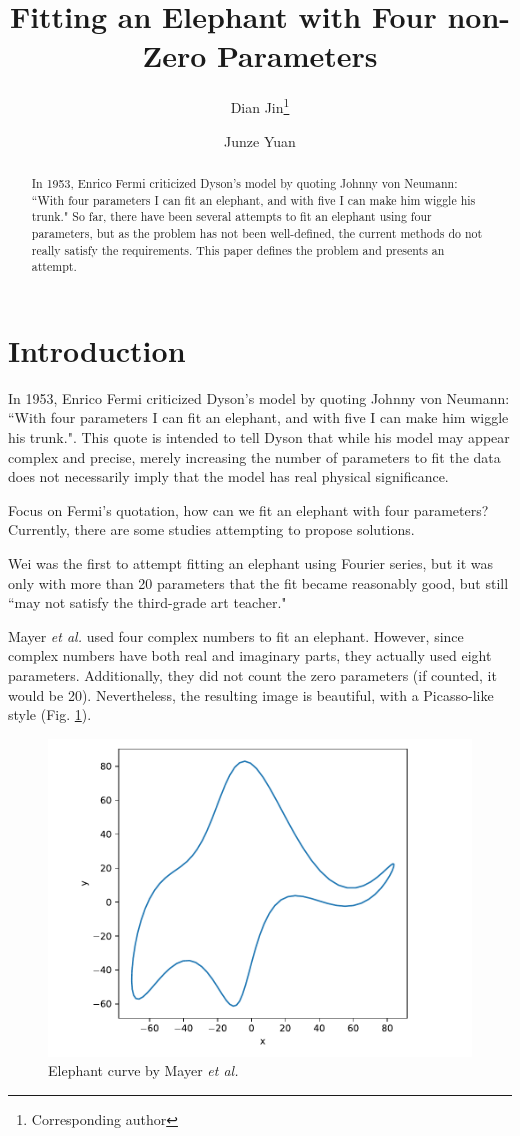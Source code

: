 \documentclass{article}
\title{Fitting an Elephant with Four non-Zero Parameters}
\author[1]{Dian Jin\thanks{Corresponding author} }
\author[2]{Junze Yuan}
\affil[1]{\textit{Research Institute for Intelligent Wearable Systems, The Hong Kong Polytechinic University}}
\affil[2]{\textit{Tampere University}}
\date{}
\begin{document}
	
\maketitle

\begin{abstract}
	In 1953, Enrico Fermi criticized Dyson’s model by quoting Johnny von Neumann: ``With four parameters I can fit an elephant, and with five I can make him wiggle his trunk." So far, there have been several attempts to fit an elephant using four parameters, but as the problem has not been well-defined, the current methods do not really satisfy the requirements. This paper defines the problem and presents an attempt.
\end{abstract}

\section{Introduction}
In 1953, Enrico Fermi criticized Dyson’s model by quoting Johnny von Neumann: ``With four parameters I can fit an elephant, and with five I can make him wiggle his trunk."\cite{dyson2004meeting}.
This quote is intended to tell Dyson that while his model may appear complex and precise, merely increasing the number of parameters to fit the data does not necessarily imply that the model has real physical significance. 

Focus on Fermi's quotation, how can we fit an elephant with four parameters? Currently, there are some studies attempting to propose solutions.

Wei \cite{wei1975least} was the first to attempt fitting an elephant using Fourier series, but it was only with more than 20 parameters that the fit became reasonably good, but still ``may not satisfy the third-grade art teacher."

Mayer \textit{et al.} \cite{mayerDrawingElephantFour2010} used four complex numbers to fit an elephant. However, since complex numbers have both real and imaginary parts, they actually used eight parameters. Additionally, they did not count the zero parameters (if counted, it would be 20). Nevertheless, the resulting image is beautiful, with a Picasso-like style (Fig. \ref{fig:elephant2010}).




\begin{figure}[h]
	\centering
	\includegraphics[width=0.6\linewidth]{elephant2010}
	\caption{Elephant curve by Mayer \textit{et al.}}
	\label{fig:elephant2010}
\end{figure}
\end{document}
